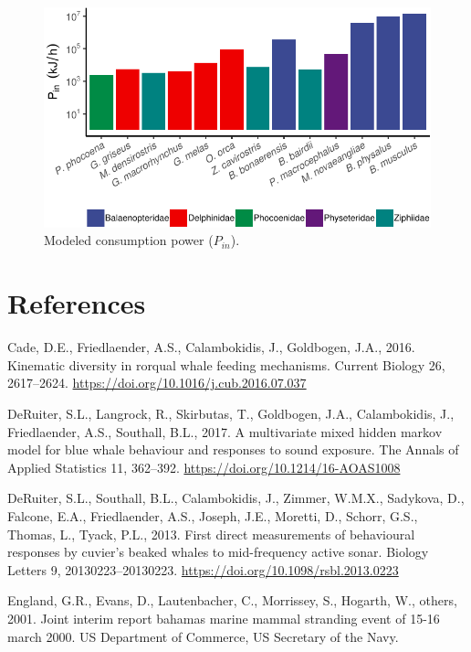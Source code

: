 \documentclass[]{elsarticle} %
\makeatletter
\def\maxwidth{\ifdim\Gin@nat@width>\linewidth\linewidth
\else\Gin@nat@width\fi}
\let\Oldincludegraphics\includegraphics
\renewcommand{\includegraphics}[1]{\Oldincludegraphics[width=\maxwidth]{#1}}
\makeatother
\begin{document}
\begin{figure}
\centering
\includegraphics{Sonar_Response_Manuscript_files/figure-latex/unnamed-chunk-3-1.pdf}
\caption{Modeled consumption power (\(P_{in}\)). \label{Pin_fig}}
\end{figure}

\section*{References}\label{references}

\hypertarget{refs}{}
\hypertarget{ref-cade_kinematic_2016}{}
Cade, D.E., Friedlaender, A.S., Calambokidis, J., Goldbogen, J.A., 2016.
Kinematic diversity in rorqual whale feeding mechanisms. Current Biology
26, 2617--2624. \url{https://doi.org/10.1016/j.cub.2016.07.037}

\hypertarget{ref-deruiter_multivariate_2017}{}
DeRuiter, S.L., Langrock, R., Skirbutas, T., Goldbogen, J.A.,
Calambokidis, J., Friedlaender, A.S., Southall, B.L., 2017. A
multivariate mixed hidden markov model for blue whale behaviour and
responses to sound exposure. The Annals of Applied Statistics 11,
362--392. \url{https://doi.org/10.1214/16-AOAS1008}

\hypertarget{ref-deruiter_first_2013}{}
DeRuiter, S.L., Southall, B.L., Calambokidis, J., Zimmer, W.M.X.,
Sadykova, D., Falcone, E.A., Friedlaender, A.S., Joseph, J.E., Moretti,
D., Schorr, G.S., Thomas, L., Tyack, P.L., 2013. First direct
measurements of behavioural responses by cuvier's beaked whales to
mid-frequency active sonar. Biology Letters 9, 20130223--20130223.
\url{https://doi.org/10.1098/rsbl.2013.0223}

\hypertarget{ref-england_joint_2001}{}
England, G.R., Evans, D., Lautenbacher, C., Morrissey, S., Hogarth, W.,
others, 2001. Joint interim report bahamas marine mammal stranding event
of 15-16 march 2000. US Department of Commerce, US Secretary of the
Navy.
\end{document}
